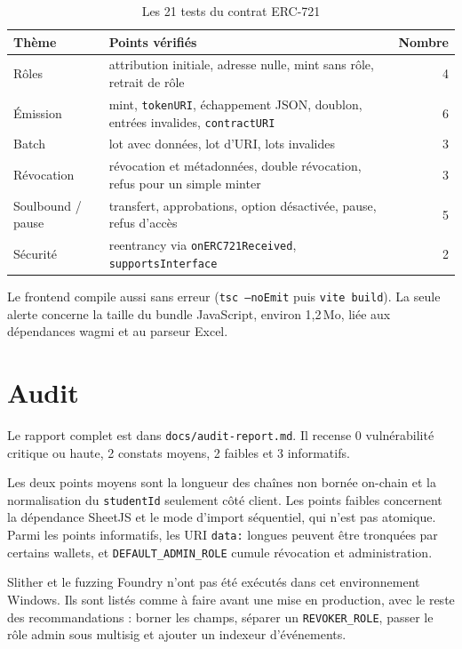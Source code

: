 \documentclass[11pt,a4paper,parskip=half]{scrartcl}
\begin{document}
\begin{table}[htbp]
\centering
\caption{Les 21 tests du contrat ERC-721}
\small
\begin{tabularx}{\textwidth}{@{}lXr@{}}
\toprule
Thème & Points vérifiés & Nombre \\
\midrule
Rôles & attribution initiale, adresse nulle, mint sans rôle, retrait de rôle & 4 \\
Émission & mint, \texttt{tokenURI}, échappement JSON, doublon, entrées invalides, \texttt{contractURI} & 6 \\
Batch & lot avec données, lot d'URI, lots invalides & 3 \\
Révocation & révocation et métadonnées, double révocation, refus pour un simple minter & 3 \\
Soulbound / pause & transfert, approbations, option désactivée, pause, refus d'accès & 5 \\
Sécurité & reentrancy via \texttt{onERC721Received}, \texttt{supportsInterface} & 2 \\
\bottomrule
\end{tabularx}
\end{table}

Le frontend compile aussi sans erreur (\texttt{tsc --noEmit} puis
\texttt{vite build}). La seule alerte concerne la taille du bundle JavaScript,
environ 1,2\,Mo, liée aux dépendances wagmi et au parseur Excel.

\section{Audit}

Le rapport complet est dans \texttt{docs/audit-report.md}. Il recense 0 vulnérabilité
critique ou haute, 2 constats moyens, 2 faibles et 3 informatifs.

Les deux points moyens sont la longueur des chaînes non bornée on-chain et la
normalisation du \texttt{studentId} seulement côté client. Les points faibles
concernent la dépendance SheetJS et le mode d'import séquentiel, qui n'est pas
atomique. Parmi les points informatifs, les URI \texttt{data:} longues peuvent
être tronquées par certains wallets, et \texttt{DEFAULT\_ADMIN\_ROLE} cumule
révocation et administration.

Slither et le fuzzing Foundry n'ont pas été exécutés dans cet environnement
Windows. Ils sont listés comme à faire avant une mise en production, avec le
reste des recommandations : borner les champs, séparer un \texttt{REVOKER\_ROLE},
passer le rôle admin sous multisig et ajouter un indexeur d'événements.
\end{document}
